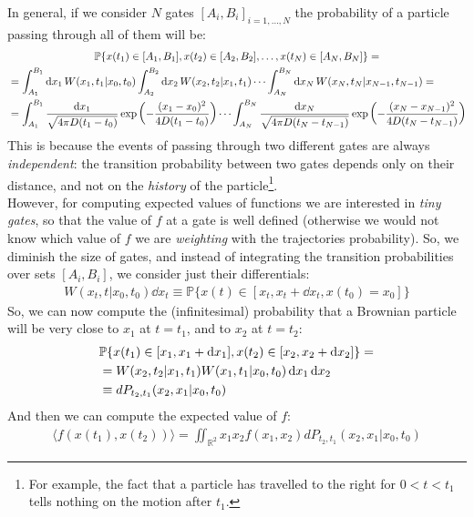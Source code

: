 \documentclass[../template.tex]{subfiles}
\begin{document}
In general, if we consider $N$ gates $[A_i, B_i]_{i=1, \dots, N}$ the probability of a particle passing through all of them will be:
\begin{align*}
    \mathbb{P}\{x(t_1) \in [A_1, B_1], x(t_2) \in [A_2, B_2], \dots, x(t_N) \in [A_N, B_N]\} = \span\\
    &=\int_{A_1}^{B_1} \dd{x_1} W(x_1, t_1 | x_0, t_0) \int_{A_2}^{B_2} \dd{x_2} W(x_2, t_2|x_1,t_1) \cdots \int_{A_N}^{B_N} \dd{x_N} W(x_N, t_N|x_{N-1}, t_{N-1}) = \\
    &= \int_{A_1}^{B_1} \frac{\dd{x_1}}{\sqrt{4 \pi D (t_1-t_0)}} \exp\left(-\frac{(x_1 - x_0)^2}{4 D (t_1 -t_0)} \right) \cdots \int_{A_N}^{B_N} \frac{\dd{x_N}}{\sqrt{4 \pi D (t_N - t_{N-1})}} \exp\left(-\frac{(x_N - x_{N-1})^2}{4 D (t_N - t_{N-1})} \right)  
\end{align*}
This is because the events of passing through two different gates are always \textit{independent}: the transition probability between two gates depends only on their distance, and not on the \textit{history} of the particle\footnote{For example, the fact that a particle has travelled to the right for $0<t<t_1$ tells nothing on the motion after $t_1$.}.\\
However, for computing expected values of functions we are interested in \textit{tiny gates}, so that the value of $f$ at a gate is well defined (otherwise we would not know which value of $f$ we are \textit{weighting} with the trajectories probability). So, we diminish the size of gates, and instead of integrating the transition probabilities over sets $[A_i, B_i]$, we consider just their differentials:
\begin{align*}
    W(x_t, t| x_0, t_0) \dd{x_t} \equiv \mathbb{P}\{x(t) \in [x_t, x_t + \dd{x_t}, x(t_0) = x_0]\}
\end{align*}
So, we can now compute the (infinitesimal) probability that a Brownian particle will be very close to $x_1$ at $t=t_1$, and to $x_2$ at $t= t_2$:
\begin{align*}
    \mathbb{P}\{x(t_1) \in [x_1, x_1+\dd{x_1}], x(t_2) \in [x_2, x_2 + \dd{x_2}]\} = \span \\
    &= W(x_2, t_2|x_1, t_1)W(x_1, t_1|x_0, t_0)  \dd{x_1}\dd{x_2} \\
    &\equiv dP_{t_2, t_1} (x_2, x_1 | x_0, t_0)
\end{align*}    
And then we can compute the expected value of $f$:
\begin{align*}
   \langle f(x(t_1), x(t_2)) \rangle = \iint_{\mathbb{R}^2} x_1 x_2 f(x_1, x_2) dP_{t_2, t_1}(x_2,x_1|x_0, t_0)
\end{align*}
\end{document}
